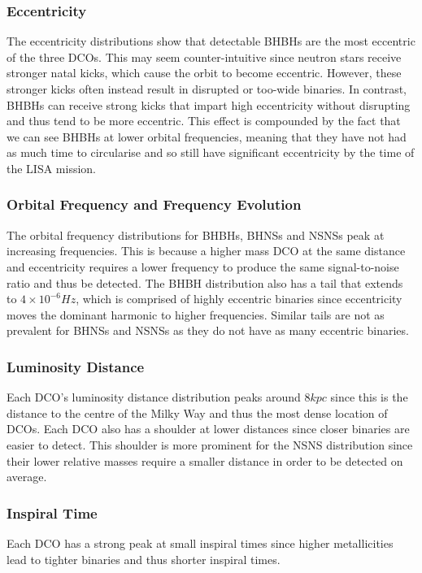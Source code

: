 \subsubsection{Eccentricity}
The eccentricity distributions show that detectable BHBHs are the most eccentric of the three DCOs. This may seem counter-intuitive since neutron stars receive stronger natal kicks, which cause the orbit to become eccentric. However, these stronger kicks often instead result in disrupted or too-wide binaries. In contrast, BHBHs can receive strong kicks that impart high eccentricity without disrupting and thus tend to be more eccentric. This effect is compounded by the fact that we can see BHBHs at lower orbital frequencies, meaning that they have not had as much time to circularise and so still have significant eccentricity by the time of the LISA mission.

\subsubsection{Orbital Frequency and Frequency Evolution}
The orbital frequency distributions for BHBHs, BHNSs and NSNSs peak at increasing frequencies. This is because a higher mass DCO at the same distance and eccentricity requires a lower frequency to produce the same signal-to-noise ratio and thus be detected. The BHBH distribution also has a tail that extends to $4 \times 10^{-6} \unit{Hz}$, which is comprised of highly eccentric binaries since eccentricity moves the dominant harmonic to higher frequencies. Similar tails are not as prevalent for BHNSs and NSNSs as they do not have as many eccentric binaries.

\subsubsection{Luminosity Distance}
Each DCO's luminosity distance distribution peaks around $8 \unit{kpc}$ since this is the distance to the centre of the Milky Way and thus the most dense location of DCOs. Each DCO also has a shoulder at lower distances since closer binaries are easier to detect. This shoulder is more prominent for the NSNS distribution since their lower relative masses require a smaller distance in order to be detected on average.

\subsubsection{Inspiral Time}
Each DCO has a strong peak at small inspiral times since higher metallicities lead to tighter binaries and thus shorter inspiral times. 

